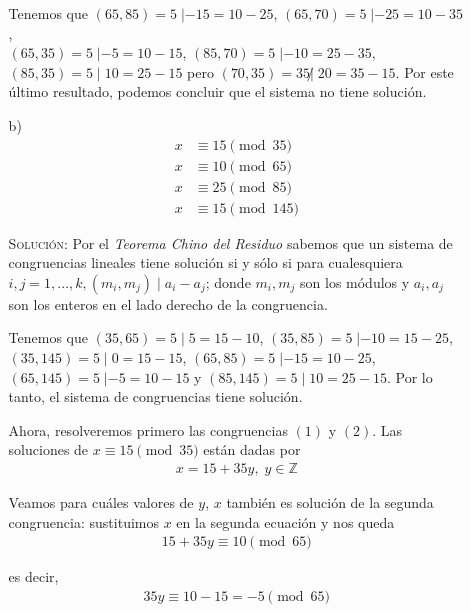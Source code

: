 \documentclass[letterpaper,11pt]{article}
\begin{document}
\begin{enumerate}
\begin{itemize}
        Tenemos que $(65,85) = 5 \; | -15 = 10-25$, $(65, 70) = 5 \; | -25 =
        10-35$, \\ $(65, 35) = 5 \; | -5 = 10-15$, $(85, 70) = 5 \; | -10 = 
        25-35$, $(85, 35)= 5 \; | \; 10 =25-15$ pero $(70, 35) = 35  \not | \;
        20 = 35-15$. Por este último resultado, podemos concluir que el sistema
        no tiene solución.
        
        \item[b)]
        \begin{align}
            x &\equiv 15 \pmod{35} \\
            x &\equiv 10 \pmod{65} \\
            x &\equiv 25 \pmod{85} \\
            x &\equiv 15 \pmod{145}
        \end{align}
        
        \textsc{Solución:} Por el \textit{Teorema Chino del Residuo} sabemos que
        un sistema de congruencias lineales tiene solución si y sólo si para
        cualesquiera $i, j = 1,...,k, (m_{i}, m_{j}) \; | \; a_{i} - a_{j}$;
        donde $m_{i}, m_{j}$ son los módulos y $a_{i}, a_{j}$ son los enteros
        en el lado derecho de la congruencia.
        
        Tenemos que $(35,65) = 5 \; | \; 5 = 15-10$, $(35,85) = 5 \; | -10 
        = 15-25$, \\ $(35,145) = 5 \; | \; 0 = 15-15$, $(65,85) = 5 \; | -15
        = 10-25$, $(65,145) = 5 \; | -5 = 10-15$ y $(85, 145) = 5 \; | \; 10
        = 25-15 $. Por lo tanto, el sistema de congruencias tiene solución.
        
        Ahora, resolveremos primero las congruencias $(1)$ y $(2)$. Las
        soluciones de $x \equiv 15 \pmod{35}$ están dadas por 
        \begin{align}
            x = 15 + 35y, \; y \in \mathbb{Z}
        \end{align}
        
        Veamos para cuáles valores de $y$, $x$ también es solución de la
        segunda congruencia: sustituimos $x$ en la segunda ecuación y nos
        queda 
        \begin{align*}
            15 + 35y \equiv 10 \pmod{65} 
        \end{align*}
        
        es decir, 
        \begin{align*}
            35y \equiv 10-15 = -5 \pmod{65}
        \end{align*}
        

\end{itemize}
\end{enumerate}
\end{document}
